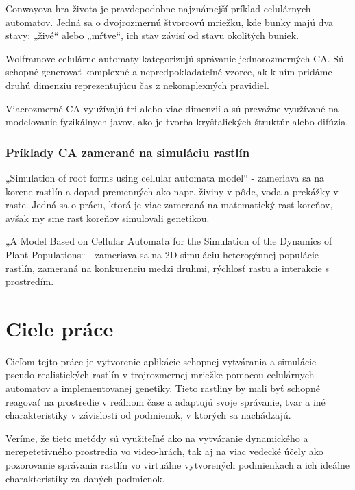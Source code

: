 \documentclass[12pt]{article}
\begin{document}
Conwayova hra života je pravdepodobne najznámejší príklad celulárnych
automatov. Jedná sa o dvojrozmernú štvorcovú mriežku, kde bunky majú dva stavy:
„živé“ alebo „mŕtve“, ich stav závisí od stavu okolitých buniek.

Wolframove celulárne automaty kategorizujú správanie jednorozmerných CA.
Sú schopné generovať komplexné a nepredpokladateľné vzorce, ak k ním pridáme
druhú dimenziu reprezentujúcu čas z nekomplexných pravidiel.

Viacrozmerné CA využívajú tri alebo viac dimenzií a sú prevažne využívané
na modelovanie fyzikálnych javov, ako je tvorba kryštalických štruktúr
alebo difúzia. %

\subsubsection{Príklady CA zamerané na simuláciu rastlín}

„Simulation of root forms using cellular automata model“ - zameriava sa na
korene rastlín a dopad premenných ako napr. živiny v pôde, voda a prekážky
v raste. Jedná sa o prácu, ktorá je viac zameraná na matematický rast koreňov,
avšak my sme rast koreňov simulovali genetikou.

„A Model Based on Cellular Automata for the Simulation of the Dynamics of
Plant Populations“ - zameriava sa na 2D simuláciu heterogénnej populácie
rastlín, zameraná na konkurenciu medzi druhmi, rýchlosť rastu a interakcie
s prostredím.

\section{Ciele práce}

Cieľom tejto práce je vytvorenie aplikácie schopnej vytvárania a simulácie
pseudo-rea\-listických rastlín v trojrozmernej mriežke pomocou celulárnych
automatov a implementovanej genetiky.
Tieto rastliny by mali byť schopné reagovať na prostredie v reálnom čase
a adaptujú svoje správanie, tvar a iné charakteristiky v závislosti
od podmienok, v ktorých sa nachádzajú.

Veríme, že tieto metódy sú využiteľné ako na vytváranie dynamického
a nerepetetivného prostredia vo video-hrách, tak aj na viac vedecké účely
ako pozorovanie správania rastlín vo virtuálne vytvorených podmienkach
a ich ideálne charakteristiky za daných podmienok.
\end{document}
